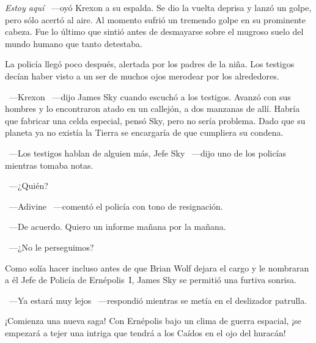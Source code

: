 \emph{Estoy aquí} ~---oyó Krexon a su espalda. Se dio la vuelta deprisa y lanzó un golpe, pero sólo acertó al aire. Al momento sufrió un tremendo golpe en su prominente cabeza. Fue lo último que sintió antes de desmayarse sobre el mugroso suelo del mundo humano que tanto detestaba.

La policía llegó poco después, alertada por los padres de la niña. Los testigos decían haber visto a un ser de muchos ojos merodear por los alrededores.

~---Krexon ~---dijo James Sky cuando escuchó a los testigos. Avanzó con sus hombres y lo encontraron atado en un callejón, a dos manzanas de allí. Habría que fabricar una celda especial, pensó Sky, pero no sería problema. Dado que su planeta ya no existía la Tierra se encargaría de que cumpliera su condena.

~---Los testigos hablan de alguien más, Jefe Sky ~---dijo uno de los policías mientras tomaba notas.

~---¿Quién?

~---Adivine ~---comentó el policía con tono de resignación.

~---De acuerdo. Quiero un informe mañana por la mañana.

~---¿No le perseguimos?

Como solía hacer incluso antes de que Brian Wolf dejara el cargo y le nombraran a él Jefe de Policía de Ernépolis~I, James Sky se permitió una furtiva sonrisa.

~---Ya estará muy lejos ~---respondió mientras se metía en el deslizador patrulla.

\begin{next}
    ¡Comienza una nueva saga! Con Ernépolis bajo un clima de guerra espacial, ¡se empezará a tejer una intriga que tendrá a los Caídos en el ojo del huracán!
\end{next}

\endinput
